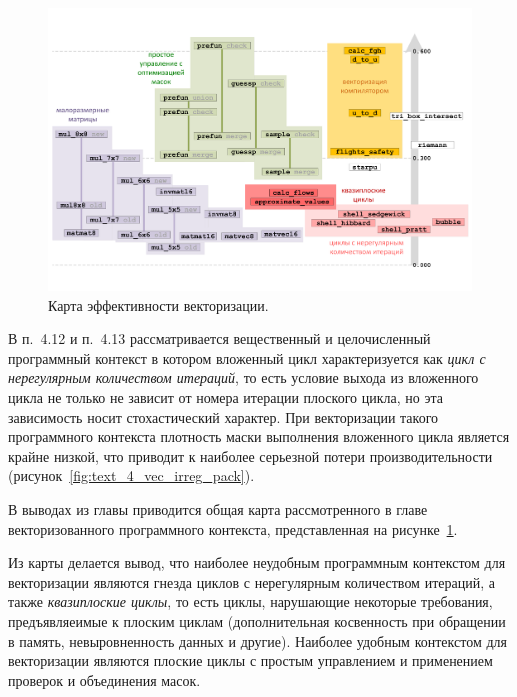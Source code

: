 \documentclass[a4paper,14pt]{extarticle}                     %
\theoremstyle{plain}                                         %
\begin{document}
\begin{figure}[!ht]
\centering
\includegraphics[width=1.0\textwidth]{./pics/text_4_fin/map_cut.pdf}
\singlespacing
{}\caption{Карта эффективности векторизации.}
\label{fig:text_4_fin_map}
\end{figure}

В п.~4.12 и п.~4.13 рассматривается вещественный и целочисленный программный контекст в котором вложенный цикл характеризуется как \textit{цикл с нерегулярным количеством итераций}, то есть условие выхода из вложенного цикла не только не зависит от номера итерации плоского цикла, но эта зависимость носит стохастический характер.
При векторизации такого программного контекста плотность маски выполнения вложенного цикла является крайне низкой, что приводит к наиболее серьезной потери производительности (рисунок~\ref{fig:text_4_vec_irreg_pack}). 


В выводах из главы приводится общая карта рассмотренного в главе векторизованного программного контекста, представленная на рисунке~\ref{fig:text_4_fin_map}.

Из карты делается вывод, что наиболее неудобным программным контекстом для векторизации являются гнезда циклов с нерегулярным количеством итераций, а также \textit{квазиплоские циклы}, то есть циклы, нарушающие некоторые требования, предъявляеимые к плоским циклам (дополнительная косвенность при обращении в память, невыровненность данных и другие).
Наиболее удобным контекстом для векторизации являются плоские циклы с простым управлением и применением проверок и объединения масок.

\end{document}
